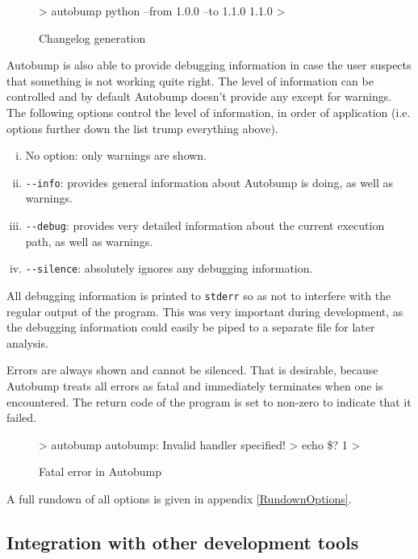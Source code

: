 \documentclass{l4proj}
\newcommand\genericstyle{\lstset{basicstyle=\ttm}}
\newcommand\codeinline[1]{{\genericstyle\lstinline!#1!}}
\begin{document}
\begin{figure}[H]
\centering
\caption{Changelog generation}
\begin{Bverbatim}
> autobump python --from 1.0.0 --to 1.1.0
1.1.0
>
\end{Bverbatim}
\end{figure}

Autobump is also able to provide debugging information in case the
user suspects that something is not working quite right. The level of
information can be controlled and by default Autobump doesn't provide
any except for warnings. The following options control the level of
information, in order of application (i.e. options further down the
list trump everything above).

\begin{enumerate}[(i)]
\item No option: only warnings are shown.
\item \codeinline{--info}: provides general information about Autobump
is doing, as well as warnings.
\item \codeinline{--debug}: provides very detailed information about
the current execution path, as well as warnings.
\item \codeinline{--silence}: absolutely ignores any debugging
information.
\end{enumerate}

All debugging information is printed to \codeinline{stderr} so as not
to interfere with the regular output of the program. This was very
important during development, as the debugging information could
easily be piped to a separate file for later analysis.

Errors are always shown and cannot be silenced. That is desirable,
because Autobump treats all errors as fatal and immediately terminates
when one is encountered. The return code of the program is set to
non-zero to indicate that it failed.

\begin{figure}[H]
\centering
\caption{Fatal error in Autobump}
\begin{Bverbatim}
> autobump
autobump: Invalid handler specified!
> echo \$?
1
>
\end{Bverbatim}
\end{figure}

A full rundown of all options is given in appendix \ref{RundownOptions}.

\subsection{Integration with other development tools}
\end{document}
